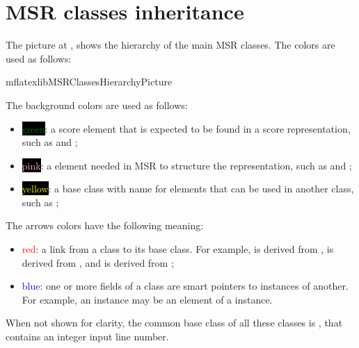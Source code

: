 \section{MSR classes inheritance}\label{MSR classes inheritance}

The picture at , shows the hierarchy of the main MSR classes. The  colors are used as follows:

{mflatexlibMSRClassesHierarchyPicture}

The background colors are used as follows:
\begin{itemize}
\item \colorbox{black}{\textcolor{green}{green}}: a score element that is expected to be found in a score representation, such as  and ;

\item \colorbox{black}{\textcolor{pink}{pink}}: a element needed in MSR to structure the representation, such as  and ;

\item \colorbox{black}{\textcolor{yellow}{yellow}}: a base class   with name  for elements that can be used in another class, such as ;
\end{itemize}

The arrows colors have the following meaning:
\begin{itemize}
\item \textcolor{red}{red}: a link from a class   to its base class. For example,  is derived from ,  is derived from , and  is derived from ;

\item \textcolor{blue}{blue}: one or more fields of a class   are smart pointers to instances of another. For example, an  instance may be an element of a  instance.
\end{itemize}

When not shown for clarity, the common base class   of all these classes is , that contains an integer input line number.

